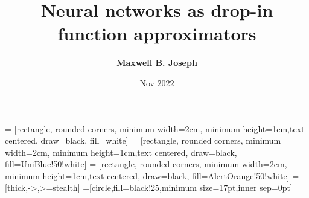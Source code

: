 \usepackage{algorithm}
\usepackage[noend]{algorithmic}
\renewcommand\algorithmicdo{:}
\renewcommand\algorithmicthen{:}
\renewcommand\algorithmicrequire{\textbf{Input:}}
\renewcommand\algorithmicensure{\textbf{Output:}}

\usepackage{tikz}
\usetikzlibrary{positioning,shapes,arrows}

\theoremstyle{definition}
\newenvironment{mythm}{\begin{alertblock}{定理}}{\end{alertblock}} %



\title{Neural networks as drop-in function approximators}
\author{\textbf{Maxwell B. Joseph}}
\date{Nov 2022}

\usetikzlibrary{shapes.geometric, arrows}
 = [rectangle, rounded corners, minimum width=2cm, minimum height=1cm,text centered, draw=black, fill=white]
 = [rectangle, rounded corners, minimum width=2cm, minimum height=1cm,text centered, draw=black, fill=UniBlue!50!white]
 = [rectangle, rounded corners, minimum width=2cm, minimum height=1cm,text centered, draw=black, fill=AlertOrange!50!white]
 = [thick,->,>=stealth]
=[circle,fill=black!25,minimum size=17pt,inner sep=0pt]

\def\layersep{2cm}


\usepackage[symbol]{footmisc}
\renewcommand{\thefootnote}{\fnsymbol{footnote}}

